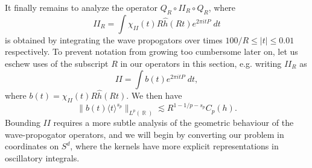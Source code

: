 \documentclass[dvipsnames,letterpaper,12pt]{article}
\DeclareMathOperator{\RR}{\mathbb{R}}
\begin{document}
It finally remains to analyze the operator $Q_R \circ II_R \circ Q_R$, where
%
\[ II_R = \int \chi_{II}(t) R \widehat{h}(Rt) e^{2 \pi i t P}\; dt \] %
%
is obtained by integrating the wave propogators over times $100/R \leq |t| \leq 0.01$ respectively. To prevent notation from growing too cumbersome later on, let us eschew uses of the subscript $R$ in our operators in this section, e.g. writing $II_R$ as
%
\[ II = \int b(t) e^{2 \pi i t P}\; dt, \]
%
where $b(t) = \chi_{II}(t) R \widehat{h}(Rt)$. We then have
%
\[ \| b(t) \langle t \rangle^{s_p} \|_{L^p(\RR)} \lesssim R^{1 - 1/p - s_p} C_p(h). \]
%
Bounding $II$ requires a more subtle analysis of the geometric behaviour of the wave-propogator operators, and we will begin by converting our problem in coordinates on $S^d$, where the kernels have more explicit representations in oscillatory integrals.
\end{document}

